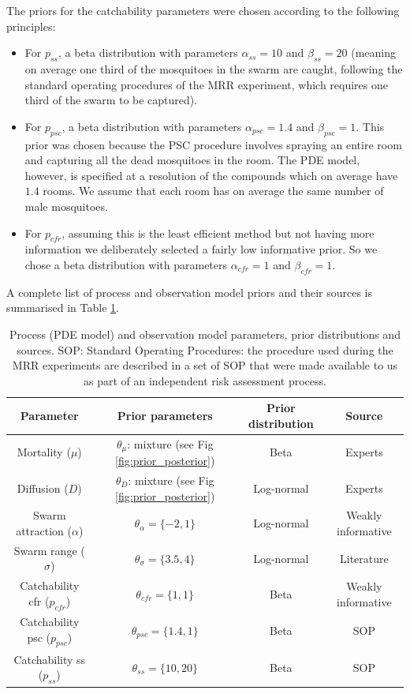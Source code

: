 \documentclass[]{bmcart}
\begin{document}
The priors for the catchability parameters were chosen according to the following principles:
\begin{itemize}
\item For $p_{ss}$, a beta distribution with parameters $\alpha_{ss} = 10$ and $\beta_{ss} = 20$ (meaning on average one third of the mosquitoes in the swarm are caught, following the standard operating procedures of the MRR experiment, which requires one third of the swarm to be captured).
\item For $p_{psc}$, a beta distribution with parameters $\alpha_{psc} = 1.4$ and $\beta_{psc} = 1$. This prior was chosen because the PSC procedure involves spraying an entire room and capturing all the dead mosquitoes in the room. The PDE model, however, is specified at a resolution of the compounds which on average have $1.4$ rooms. We assume that each room has on average the same number of male mosquitoes.
\item For $p_{cfr}$, assuming this is the least efficient method but not having more information we deliberately selected a fairly low informative prior. So we chose a beta distribution with parameters $\alpha_{cfr} = 1$ and $\beta_{cfr} = 1$.
\end{itemize} 
A complete list of process and observation model priors and their sources is summarised in Table \ref{tble:prior}.

\begin{table}[h]
\centering
\begingroup\small
\begin{tabular}{|c|ccc|}
\hline
Parameter & Prior parameters & Prior distribution & Source \\\hline
Mortality ($\mu$) & $ \theta_\mu$: mixture (see Fig \ref{fig:prior_posterior}) & Beta & Experts\\
Diffusion ($D$) & $\theta_D$: mixture (see Fig \ref{fig:prior_posterior}) & Log-normal & Experts\\
Swarm attraction ($\alpha$) & $\theta_\alpha = \{ -2, 1 \}$ & Log-normal &  Weakly informative \\ 
Swarm range ($\sigma$) &  $\theta_\sigma = \{3.5, 4 \}$ & Log-normal &  Literature\\ 
Catchability cfr ($p_{cfr}$) & $\theta_{cfr} =\{1, 1\}$ & Beta & Weakly informative \\ 
Catchability psc ($p_{psc}$) & $\theta_{psc} =\{1.4, 1\}$ & Beta & SOP \\ 
Catchability ss ($p_{ss}$) & $\theta_{ss} =\{10, 20\}$ & Beta & SOP \\
\hline
\end{tabular}
\endgroup
\caption{\label{tble:prior} Process (PDE model) and observation model parameters, prior distributions and sources. SOP: Standard Operating Procedures: the procedure used during the MRR experiments are described in a set of SOP that were made available to us as part of an independent risk assessment process.}
\end{table}
\end{document}
